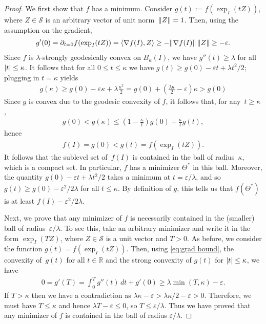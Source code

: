 \documentclass[aos]{imsart}
\theoremstyle{definition}
\DeclarePairedDelimiter{\abs}{\lvert}{\rvert}
\DeclarePairedDelimiter{\norm}{\lVert}{\rVert}
\newcommand{\R}{{\mathbb{R}}}
\newcommand{\eps}{\varepsilon}
\newcommand{\Sym}{\mathcal{S}}
\begin{document}
\begin{proof}
We first show that $f$ has a minimum.
Consider $g(t) := f(\exp_I(tZ))$, where $Z\in \Sym$ is an arbitrary vector of unit norm~$\norm Z = 1$.
Then, using the assumption on the gradient,
\begin{align}\label{eq:grad bound}
  g'(0)
= \partial_{t=0} f(\exp_{I}(tZ))
= \braket{\nabla f(I), Z}
\geq -\norm{\nabla f(I)} \, \norm Z
\geq -\eps.
\end{align}
Since $f$ is $\lambda$-strongly geodesically convex on $B_\kappa(I)$, we have $g''(t) \geq \lambda$ for all $\abs t\leq\kappa$. It follows that
for all $0 \leq t \leq \kappa$ we have $g(t) \geq g(0) - \eps t + \lambda t^2/2$; plugging in $t = \kappa$ yields
\begin{align*}
  g(\kappa)
\geq g(0) - \eps \kappa + \lambda \frac{\kappa^2}2
= g(0) + \left( \frac{\lambda\kappa}2 - \eps \right) \kappa
> g(0)
\end{align*}
Since $g$ is convex due to the geodesic convexity of $f$, it follows that, for any~$t \geq \kappa$,
\begin{align*}
  g(0) < g(\kappa) \leq \left( 1-\frac{\kappa}t \right) g(0) + \frac{\kappa}t g(t),
\end{align*}
hence
\begin{align*}
  f(I) = g(0) < g(t) = f(\exp_{I}(tZ)).
\end{align*}
It follows that the sublevel set of~$f(I)$ is contained in the ball of radius~$\kappa$, which is a compact set.
In particular, $f$ has a minimizer $\Theta^*$ in this ball. Moreover, the quantity $ g(0) - \eps t + \lambda t^2/2$ takes a minimum at $t = \eps/ \lambda$, and so $g(t) \geq g(0) - \eps^2/2\lambda$ for all $t \leq \kappa$. By definition of $g$, this tells us that $f(\Theta^*)$ is at least $f(I) - \eps^2/2\lambda$.

Next, we prove that any minimizer of $f$ is necessarily contained in the (smaller) ball of radius~$\eps/\lambda$.
To see this, take an arbitrary minimizer and write it in the form $\exp_I(TZ)$, where $Z\in \Sym$ is a unit vector and $T>0$.
As before, we consider the function $g(t) = f(\exp_I(tZ))$.
Then, using \cref{eq:grad bound}, the convexity of~$g(t)$ for all $t\in\R$ and the strong convexity of $g(t)$ for $\abs t \leq \kappa$, we have
\begin{align*}
  0 = g'(T) = \int_0^T g''(t) \, dt + g'(0) \geq \lambda \min(T, \kappa) - \eps.
\end{align*}
If $T>\kappa$ then we have a contradiction as $\lambda\kappa - \eps > \lambda\kappa/2 - \eps > 0$.
Therefore, we must have $T\leq\kappa$ and hence $\lambda T - \eps \leq 0$, so $T \leq \eps/\lambda$.
Thus we have proved that any minimizer of $f$ is contained in the ball of radius $\eps/\lambda$.


\end{proof}
\end{document}
